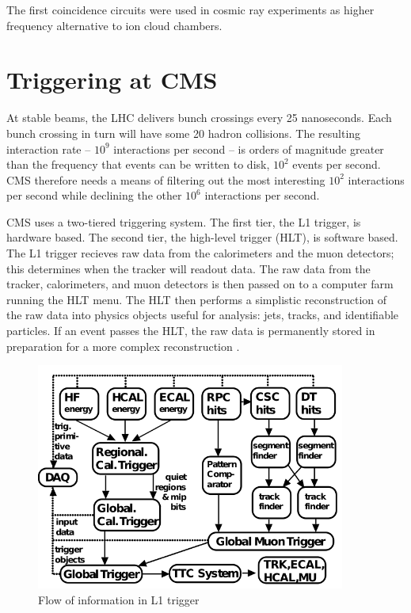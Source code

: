 The first coincidence circuits were used in cosmic ray experiments as higher frequency alternative to ion cloud chambers. 

\section{Triggering at CMS}

At stable beams, the LHC delivers bunch crossings every 25 nanoseconds. Each bunch crossing in turn will have some 20 hadron collisions. The resulting interaction rate -- $10^9$ interactions per second -- is orders of magnitude greater than the frequency that events can be written to disk, $10^2$ events per second. CMS therefore needs a means of filtering out the most interesting $10^2$ interactions per second while declining the other $10^6$ interactions per second. 

CMS uses a two-tiered triggering system. The first tier, the L1 trigger, is hardware based. The second tier, the high-level trigger (HLT), is software based. The L1 trigger recieves raw data from the calorimeters and the muon detectors; this determines when the tracker will readout data. The raw data from the tracker, calorimeters, and muon detectors is then passed on to a computer farm running the HLT menu. The HLT then performs a simplistic reconstruction of the raw data into physics objects useful for analysis: jets, tracks, and identifiable particles. If an event passes the HLT, the raw data is permanently stored in preparation for a more complex reconstruction \cite{Dasu:2000ge}\cite{Sphicas:2002gg}. 

\begin{figure}[h!]
\begin{centering}
\includegraphics[width=4in]{Chapter5/importfigs/l1_trigger_flow.png}
\par\end{centering}
\caption{Flow of information in L1 trigger \label{fig:l1TriggerFlow}}
\end{figure}

